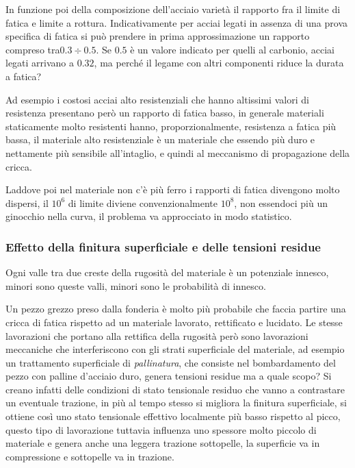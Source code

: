 			In funzione poi della composizione dell'acciaio varietà il rapporto fra il limite di fatica e limite a rottura. Indicativamente per acciai legati in assenza  di una prova specifica di fatica si può prendere in prima approssimazione un rapporto compreso tra$  0.3 \div 0.5 $. Se $ 0.5 $ è un valore indicato per quelli al carbonio, acciai legati arrivano a $ 0.32 $, ma perché il legame con altri componenti riduce la durata a fatica? 
			
			Ad esempio i costosi acciai alto resistenziali che hanno altissimi valori di resistenza presentano però un rapporto di fatica basso, in generale materiali staticamente molto resistenti hanno, proporzionalmente, resistenza a fatica più bassa, il materiale alto resistenziale è un materiale che essendo più duro e nettamente più sensibile all'intaglio, e quindi al meccanismo di propagazione della cricca.
			
			Laddove poi nel materiale non c'è più ferro i rapporti di fatica divengono molto dispersi, il $10^6$ di limite diviene convenzionalmente $10^8$, non essendoci più un ginocchio nella curva, il problema va approcciato in modo statistico. 
						
\subsubsection{		 Effetto della finitura superficiale e delle tensioni residue}
			 Ogni valle tra due creste della rugosità del materiale è un potenziale innesco, minori sono queste valli, minori sono le probabilità di innesco.
			 
			 Un pezzo grezzo preso dalla fonderia è molto più probabile che faccia partire una cricca di fatica rispetto ad un materiale lavorato, rettificato e lucidato. Le stesse lavorazioni che portano alla rettifica della rugosità però sono lavorazioni meccaniche che interferiscono  con gli strati superficiale del materiale, ad esempio un trattamento superficiale di \textit{pallinatura}, che consiste nel bombardamento del pezzo con palline d'acciaio duro, genera tensioni residue ma a quale scopo? Si creano infatti delle condizioni di stato tensionale residuo che vanno a contrastare un eventuale trazione, in più al tempo stesso si migliora la finitura superficiale, si ottiene così uno stato tensionale effettivo localmente più basso rispetto al picco, questo tipo di lavorazione tuttavia influenza uno spessore molto piccolo di materiale e genera anche una leggera trazione sottopelle, la superficie va in compressione e sottopelle va in trazione. 
			 

